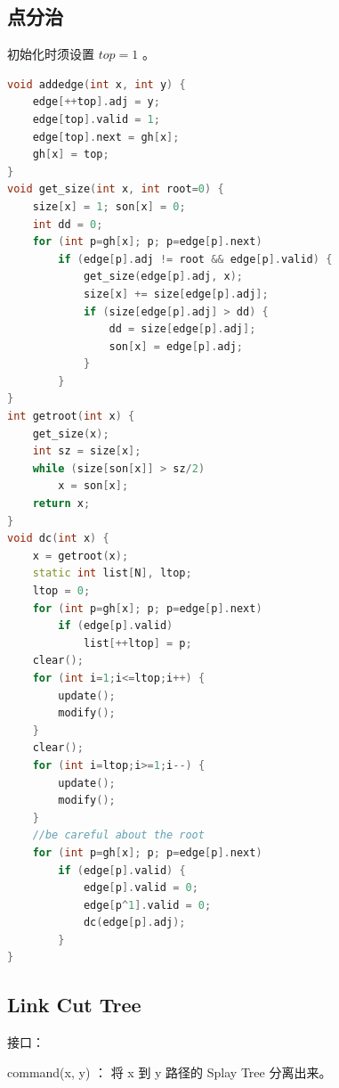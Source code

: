 \documentclass{article}
\begin{document}
\subsection{点分治}
初始化时须设置 $top = 1$ 。
\begin{lstlisting}[language=C++]
void addedge(int x, int y) {
	edge[++top].adj = y;
	edge[top].valid = 1;
	edge[top].next = gh[x];
	gh[x] = top;
}
void get_size(int x, int root=0) {
	size[x] = 1; son[x] = 0;
	int dd = 0;
	for (int p=gh[x]; p; p=edge[p].next)
		if (edge[p].adj != root && edge[p].valid) {
			get_size(edge[p].adj, x);
			size[x] += size[edge[p].adj];
			if (size[edge[p].adj] > dd) {
				dd = size[edge[p].adj];
				son[x] = edge[p].adj;
			}
		}
}
int getroot(int x) {
	get_size(x);
	int sz = size[x];
	while (size[son[x]] > sz/2)
		x = son[x];
	return x;
}
void dc(int x) {
	x = getroot(x);
	static int list[N], ltop;
	ltop = 0;
	for (int p=gh[x]; p; p=edge[p].next)
		if (edge[p].valid)
			list[++ltop] = p;
	clear();
	for (int i=1;i<=ltop;i++) {
		update();
		modify();
	}
	clear();
	for (int i=ltop;i>=1;i--) {
		update();
		modify();
	}
	//be careful about the root
	for (int p=gh[x]; p; p=edge[p].next)
		if (edge[p].valid) {
			edge[p].valid = 0;
			edge[p^1].valid = 0;
			dc(edge[p].adj);
		}
}
\end{lstlisting}
\subsection{Link Cut Tree}
接口： 

command(x, y) ： 将 x 到 y 路径的 Splay Tree 分离出来。 
\end{document}
